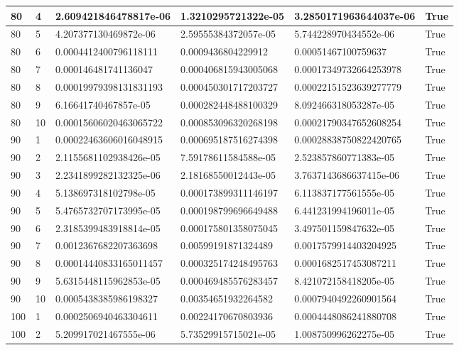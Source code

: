 \documentclass[a4paper, 12pt]{report}
\def\tabsize{4.4cm}
\def\stabsize{0.97cm}
\def\mtabsize{0.73cm}
\begin{document}
\begin{center}
\begin{longtable}{|m{\stabsize}|m{\stabsize}|m{\tabsize}|m{\tabsize}|m{\tabsize}|m{\mtabsize}|}
80 & 4 & 2.609421846478817e-06 & 1.3210295721322e-05 & 3.2850171963644037e-06 & True \\ \hline  
80 & 5 & 4.207377130469872e-06 & 2.59555384372057e-05 & 5.744228970434552e-06 & True \\ \hline  
80 & 6 & 0.0004412400796118111 & 0.0009436804229912 & 0.00051467100759637 & True \\ \hline  
80 & 7 & 0.000146481741136047 & 0.000406815943005068 & 0.00017349732664253978 & True \\ \hline  
80 & 8 & 0.00019979398131831193 & 0.000450301717203727 & 0.00022151523639277779 & True \\ \hline  
80 & 9 & 6.16641740467857e-05 & 0.000282448488100329 & 8.092466318053287e-05 & True \\ \hline  
80 & 10 & 0.00015606020463065722 & 0.000853096320268198 & 0.00021790347652608254 & True \\ \hline  
90 & 1 & 0.00022463606016048915 & 0.000695187516274398 & 0.00028838750822420765 & True \\ \hline  
90 & 2 & 2.1155681102938426e-05 & 7.59178611584588e-05 & 2.523857860771383e-05 & True \\ \hline  
90 & 3 & 2.2341899282132325e-06 & 2.18168550012443e-05 & 3.7637143686637415e-06 & True \\ \hline  
90 & 4 & 5.138697318102798e-05 & 0.000173899311146197 & 6.113837177561555e-05 & True \\ \hline  
90 & 5 & 5.4765732707173995e-05 & 0.000198799696649488 & 6.441231994196011e-05 & True \\ \hline  
90 & 6 & 2.3185399483918814e-05 & 0.000175801358075045 & 3.497501159847632e-05 & True \\ \hline  
90 & 7 & 0.0012367682207363698 & 0.00599191871324489 & 0.0017579914403204925 & True \\ \hline  
90 & 8 & 0.00014440833165011457 & 0.000325174248495763 & 0.0001682517453087211 & True \\ \hline  
90 & 9 & 5.6315448115962853e-05 & 0.000469485576283457 & 8.421072158418205e-05 & True \\ \hline  
90 & 10 & 0.0005438385986198327 & 0.00354651932264582 & 0.0007940492260901564 & True \\ \hline  
100 & 1 & 0.0002506940463304611 & 0.00224170670803936 & 0.0004448086241880708 & True \\ \hline  
100 & 2 & 5.209917021467555e-06 & 5.73529915715021e-05 & 1.008750996262275e-05 & True \\ \hline  

\end{longtable}
\end{center}
\end{document}
